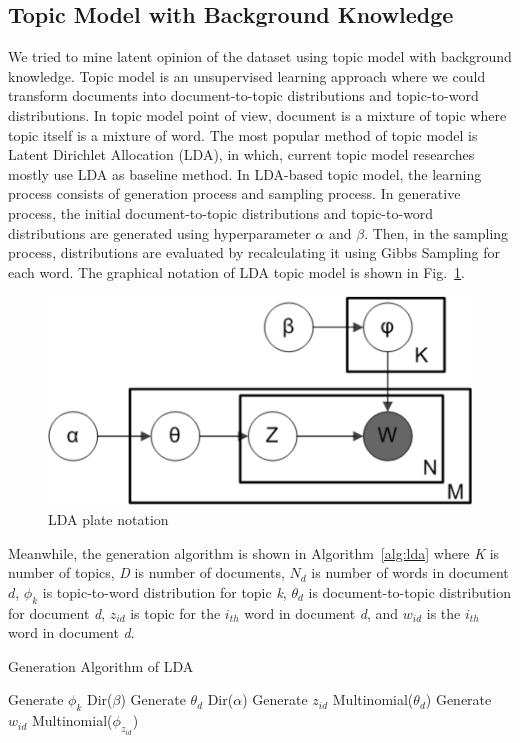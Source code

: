 \documentclass[10pt, conference, compsocconf]{IEEEtran}
\begin{document}
\subsection{Topic Model with Background Knowledge}
We tried to mine latent opinion of the dataset  using topic  model with background knowledge. Topic model is an unsupervised learning approach where we could transform documents into document-to-topic distributions and topic-to-word distributions. In topic model point of view, document is a mixture of topic where topic itself is a mixture of word. The most popular method of topic model is Latent Dirichlet Allocation (LDA)\cite{b8}, in which, current topic model researches mostly use LDA as baseline method. In LDA-based topic model, the learning process consists of generation process and sampling process. In generative process, the initial document-to-topic distributions and topic-to-word distributions are generated using hyperparameter $\alpha$ and $\beta$. Then, in the sampling process, distributions are evaluated by recalculating it using Gibbs Sampling for each word. The graphical notation of LDA topic model is shown in Fig.~\ref{fig_lda}.\begin{figure}[b]
	\includegraphics[scale=0.5]{lda.png}
	\caption{LDA plate notation}
\label{fig_lda}
\end{figure} Meanwhile, the generation algorithm is shown in Algorithm~\ref{alg:lda} where {\it K} is number of topics, {\it D} is number of documents, $N_d$ is number of words in document $d$, $\phi_k$ is topic-to-word distribution for topic {\it k}, $\theta_d$ is document-to-topic distribution for document {\it d}, $z_{id}$ is topic for the $i_{th}$ word in document {\it d}, and $w_{id}$ is the $i_{th}$ word in document {\it d}.

\begin{algorithm}[t]
\caption{Generation Algorithm of LDA}
\label{alg:lda}
\begin{algorithmic}[1]
\STATE Generate $\phi_k$ \texttildelow{} Dir($\beta$) 
\ENDFOR
{}
\STATE Generate $\theta_d$ \texttildelow{} Dir($\alpha$) 
\ENDFOR
{}
\STATE Generate $z_{id}$ \texttildelow{} Multinomial($\theta_d$)
\STATE Generate $w_{id}$ \texttildelow{} Multinomial($\phi_{z_{id}}$)
\ENDFOR
\end{algorithmic}
\end{algorithm}
\end{document}
